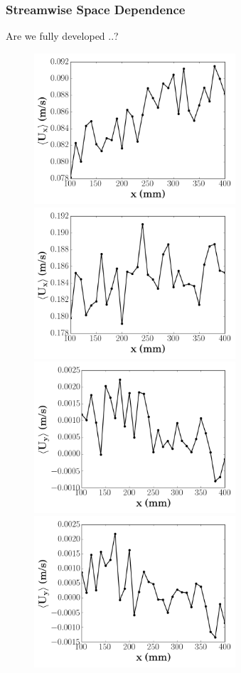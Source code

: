 \documentclass[12pt,oneside,a4paper]{article}
\begin{document}
\subsubsection{Streamwise Space Dependence}
Are we fully developed ..?\\
\begin{figure}
\centering
\includegraphics[width=7.5cm]{images/LDA_spaceDependenceImages/4Hz_15mm_MeanUx.png}\hfill
\includegraphics[width=7.5cm]{images/LDA_spaceDependenceImages/8Hz_15mm_MeanUx.png}\\
\includegraphics[width=7.5cm]{images/LDA_spaceDependenceImages/4Hz_15mm_MeanUy.png}\hfill
\includegraphics[width=7.5cm]{images/LDA_spaceDependenceImages/8Hz_15mm_MeanUy.png}\\

\end{figure}
\end{document}
